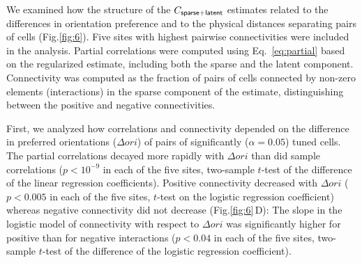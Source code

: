 \documentclass[10pt]{article}
\newcommand{\figref}[2]{Fig.\;\ref{fig:#1}\,#2}
\begin{document}
We examined how the structure of the $C_{\sf sparse+latent}$ estimates related to the differences in orientation preference and to the physical distances separating pairs of cells (Fig.\;\ref{fig:6}).  Five sites with highest pairwise connectivities were included in the analysis. Partial correlations were computed using Eq.~\ref{eq:partial} based on the regularized estimate, including both the sparse and the latent component. Connectivity was computed as the fraction of pairs of cells connected by non-zero elements (interactions) in the sparse component of the estimate, distinguishing between the positive and negative connectivities. 

First, we analyzed how correlations and connectivity depended on the difference in preferred orientations ($\Delta ori$) of pairs of significantly ($\alpha=0.05$) tuned cells. The partial correlations decayed more rapidly with $\Delta ori$ than did sample correlations ($p<10^{-9}$ in each of the five sites, two-sample $t$-test of the difference of the linear regression coefficients). Positive connectivity decreased with $\Delta ori$ ($p<0.005$ in each of the five sites, $t$-test on the logistic regression coefficient) whereas negative connectivity did not decrease (\figref{6}{D}): The slope in the logistic model of connectivity with respect to $\Delta ori$ was significantly higher for positive than for negative interactions ($p<0.04$ in each of the five sites, two-sample $t$-test of the difference of the logistic regression coefficient). 
\end{document}
